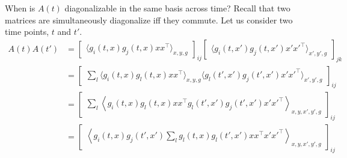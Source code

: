 \documentclass{article}
\begin{document}
When is $A(t)$ diagonalizable in the same basis across time?
Recall that two matrices are simultaneously diagonalize iff they commute.
Let us consider two time points, $t$ and $t'$.
\begin{align}
  A(t) A(t')
  &= \begin{bmatrix} \langle g_i(t,x) g_j(t,x) x x^\top \rangle_{x,y,g} \end{bmatrix}_{ij}
  \begin{bmatrix} \langle g_i(t,x') g_j(t,x') x' x'^\top \rangle_{x',y',g} \end{bmatrix}_{jk} \\
  &= \begin{bmatrix} \sum_l \langle g_i(t,x) g_l(t,x) x x^\top \rangle_{x,y,g} \langle g_l(t',x') g_j(t',x') x' x'^\top \rangle_{x',y',g} \end{bmatrix}_{ij} \\
  &= \begin{bmatrix} \sum_l \left\langle g_i(t,x) g_l(t,x) x x^\top g_l(t',x') g_j(t',x') x' x'^\top \right\rangle_{x,y,x',y',g} \end{bmatrix}_{ij} \\
  &= \begin{bmatrix} \left\langle g_i(t,x) g_j(t',x') \sum_l g_l(t,x) g_l(t',x') x x^\top x' x'^\top \right\rangle_{x,y,x',y',g} \end{bmatrix}_{ij}
\end{align}

\end{document}
